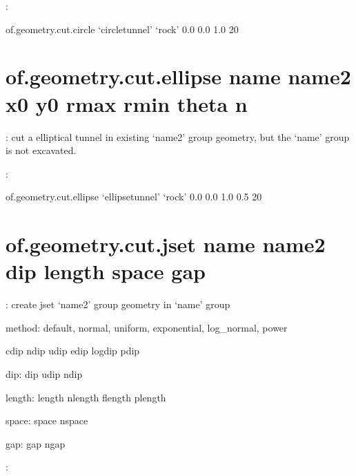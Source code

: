 \documentclass[letterpaper,10pt,english]{sphinxmanual}
\begin{document}
:

\begin{sphinxVerbatim}[commandchars=\\\{\}]
of.geometry.cut.circle ‘circle\PYGZus{}tunnel’ ‘rock’ 0.0 0.0 1.0 20
\end{sphinxVerbatim}


\section{of.geometry.cut.ellipse name name2 x0 y0 rmax rmin theta n}
\label{\detokenize{rst_tutorials/command_line_guide:of-geometry-cut-ellipse-name-name2-x0-y0-rmax-rmin-theta-n}}
: cut a elliptical tunnel in existing ‘name2’ group geometry, but
the ‘name’ group is not excavated.

:

\begin{sphinxVerbatim}[commandchars=\\\{\}]
of.geometry.cut.ellipse ‘ellipse\PYGZus{}tunnel’ ‘rock’ 0.0 0.0 1.0 0.5 20
\end{sphinxVerbatim}


\section{of.geometry.cut.jset name name2 dip length space gap}
\label{\detokenize{rst_tutorials/command_line_guide:of-geometry-cut-jset-name-name2-dip-length-space-gap}}
: create jset ‘name2’ group geometry in ‘name’ group

method: default, normal, uniform, exponential, log\_normal, power

cdip ndip udip edip logdip pdip

dip: dip udip ndip

length: length nlength flength plength

space: space nspace

gap: gap ngap

:

\begin{sphinxVerbatim}[commandchars=\\\{\}]
        
\end{sphinxVerbatim}
\end{document}
